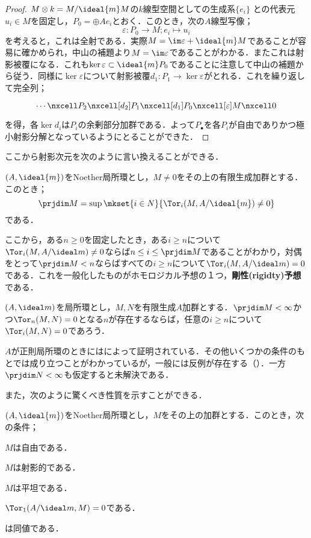 \begin{proof}
	$M\otimes k=M/\ideal{m}M$の$k$線型空間としての生成系$\{e_i\}$
	との代表元$u_i\in M$を固定し，$P_0=\oplus Ae_i$とおく．このとき，次の$A$線型写像；
	\[\varepsilon:P_0\to M;e_i\mapsto u_i\]
	を考えると，これは全射である．実際$M=\im\varepsilon+\ideal{m}M$であることが容易に確かめられ，中山の補題より$M=\im\varepsilon$であることがわかる．またこれは射影被覆になる．これも$\ker\varepsilon\subset\ideal{m}P_0$であることに注意して中山の補題から従う．同様に$\ker\varepsilon$について射影被覆$d_1:P_1\to\ker\varepsilon$がとれる．これを繰り返して完全列；
	\[\begin{tikzcd}
	\cdots\nxcell P_2\nxcell[d_2]P_1\nxcell[d_1]P_0\nxcell[\varepsilon]M\nxcell0
	\end{tikzcd}\]
	を得，各$\ker d_i$は$P_i$の余剰部分加群である．よって$P_\bullet$を各$P_i$が自由でありかつ極小射影分解となっているようにとることができた．
\end{proof}

ここから射影次元を次のように言い換えることができる．

\begin{thm}\label{thm:射影次元の言い換え}
	$(A,\ideal{m})$をNoether局所環とし，$M\neq0$をその上の有限生成加群とする．このとき；
	\[\prjdim M=\sup\mkset{i\in N}{\Tor_i(M,A/\ideal{m})\neq0}\]
	である．
\end{thm}

ここから，ある$n\geq0$を固定したとき，ある$i\geq n$について$\Tor_i(M,A/\ideal m)\neq0$ならば$n\leq i\leq\prjdim M$であることがわかり，対偶をとって$\prjdim M<n$ならばすべての$i\geq n$について$\Tor_i(M,A/\ideal m)=0$である．これを一般化したものがホモロジカル予想の１つ，\textbf{剛性(rigidty)}\textbf{予想}である．

\begin{conj}[剛性予想]
	$(A,\ideal m)$を局所環とし，$M,N$を有限生成$A$加群とする．$\prjdim M<\infty$かつ$\Tor_n(M,N)=0$となる$n$が存在するならば，任意の$i\geq n$について$\Tor_i(M,N)=0$であろう．
\end{conj}

$A$が正則局所環のときには\cite{Lichtenbaum1966}によって証明されている．その他いくつかの条件のもとでは成り立つことがわかっているが，一般には反例が存在する（\cite{Heitmann1993}）．一方$\prjdim N<\infty$も仮定すると未解決である．

また，次のように驚くべき性質を示すことができる．

\begin{prop}\label{prop:Noether局所環上では自由なり射影なり同値}
	$(A,\ideal{m})$をNoether局所環とし，$M$をその上の加群とする．このとき，次の条件；
	\begin{sakura}
		\item $M$は自由である．
		\item $M$は射影的である．
		\item $M$は平坦である．
		\item $\Tor_1(A/\ideal m,M)=0$である．
	\end{sakura}
	は同値である．
\end{prop}

